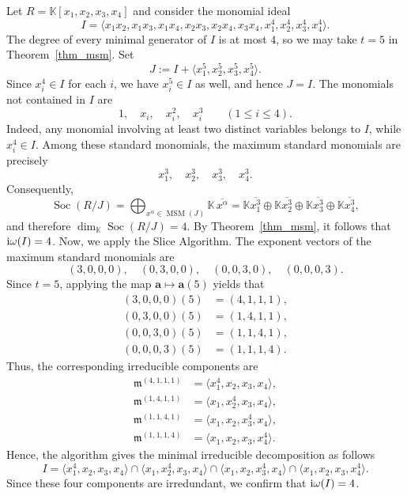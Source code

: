 \documentclass[11pt]{amsart}   %
\begin{document}
\begin{exm}
Let $R = \mathbb K[x_1, x_2, x_3, x_4]$ and consider the monomial ideal
\[
I = \langle x_1 x_2, x_1 x_3, x_1 x_4, x_2 x_3, x_2 x_4, x_3 x_4, x_1^4, x_2^4, x_3^4, x_4^4\rangle.
\]
The degree of every minimal generator of $I$ is at most $4$, so we may take $t = 5$ in Theorem~\ref{thm_msm}. Set
\[
J := I + \langle x_1^5, x_2^5, x_3^5, x_4^5 \rangle.
\]
Since $x_i^4 \in I$ for each $i$, we have $x_i^5 \in I$ as well, and hence $J = I$.
The monomials not contained in $I$ are
\[
1, \quad x_i, \quad x_i^2, \quad x_i^3 \qquad (1 \le i \le 4).
\]
Indeed, any monomial involving at least two distinct variables belongs to $I$, while $x_i^4 \in I$. Among these standard monomials, the maximum standard monomials are precisely
\[
x_1^3, \quad x_2^3, \quad x_3^3, \quad x_4^3.
\]
Consequently,
\[
\operatorname{Soc}(R/J) =
\bigoplus_{x^\alpha\in\operatorname{MSM}(J)}
\mathbb{K}\,\overline{x^\alpha}=
\mathbb K \overline{x_1^3} \oplus \mathbb K \overline{x_2^3} \oplus \mathbb K \overline{x_3^3} \oplus \mathbb K \overline{x_4^3},
\]
and therefore $\dim_{\mathbb K} \operatorname{Soc}(R/J) = 4$. By Theorem~\ref{thm_msm}, it follows that ${\rm i}\omega(I) = 4$.
Now, we apply the Slice Algorithm. The exponent vectors of the maximum standard monomials are
\[
(3,0,0,0), \quad (0,3,0,0), \quad (0,0,3,0), \quad (0,0,0,3).
\]
Since $t = 5$, applying the map $\mathbf{a} \mapsto \mathbf{a}(5)$ yields that 
\[
\begin{aligned}
(3,0,0,0)(5) &= (4,1,1,1), \\
(0,3,0,0)(5) &= (1,4,1,1), \\
(0,0,3,0)(5) &= (1,1,4,1), \\
(0,0,0,3)(5) &= (1,1,1,4).
\end{aligned}
\]
Thus, the corresponding irreducible components are
\[
\begin{aligned}
\mathfrak m^{(4,1,1,1)} &= \langle x_1^4, x_2, x_3, x_4\rangle, \\
\mathfrak m^{(1,4,1,1)} &= \langle x_1, x_2^4, x_3, x_4\rangle, \\
\mathfrak m^{(1,1,4,1)} &= \langle x_1, x_2, x_3^4, x_4\rangle, \\
\mathfrak m^{(1,1,1,4)} &= \langle x_1, x_2, x_3, x_4^4\rangle.
\end{aligned}
\]
Hence, the algorithm gives the minimal irreducible decomposition as follows
\[
I = \langle x_1^4, x_2, x_3, x_4\rangle \cap \langle x_1, x_2^4, x_3, x_4\rangle \cap \langle x_1, x_2, x_3^4, x_4\rangle \cap \langle x_1, x_2, x_3, x_4^4\rangle.
\]
Since these four components are irredundant, we confirm that ${\rm i}\omega(I) = 4$.
\end{exm}
\medskip
\end{document}
